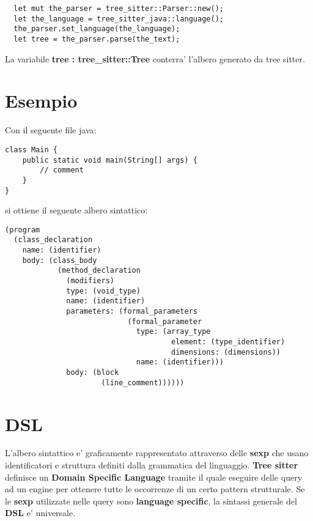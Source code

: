 \begin{verbatim}
  let mut the_parser = tree_sitter::Parser::new();
  let the_language = tree_sitter_java::language();
  the_parser.set_language(the_language);
  let tree = the_parser.parse(the_text);
\end{verbatim}

La variabile \textbf{tree : tree\_sitter::Tree} conterra' l'albero generato da tree sitter.


\section{Esempio}

Con il seguente file java:

\begin{verbatim}
class Main {
	public static void main(String[] args) {
    	// comment
    }
}
\end{verbatim}

si ottiene il seguente albero sintattico:

\begin{verbatim}
(program
  (class_declaration
    name: (identifier)
    body: (class_body
            (method_declaration
              (modifiers)
              type: (void_type)
              name: (identifier)
              parameters: (formal_parameters
                            (formal_parameter
                              type: (array_type
                                      element: (type_identifier)
                                      dimensions: (dimensions))
                              name: (identifier)))
              body: (block
                      (line_comment))))))
\end{verbatim}

\section{DSL}

L'albero sintattico e' graficamente rappresentato attraverso delle \textbf{sexp} che usano identificatori e struttura definiti dalla grammatica del linguaggio.
\textbf{Tree sitter} definisce un \textbf{Domain Specific Language} tramite il quale eseguire delle query ad un engine per ottenere tutte le occorrenze di un certo pattern strutturale.
Se le \textbf{sexp} utilizzate nelle query sono \textbf{language specific},  la sintassi generale del \textbf{DSL} e' universale.

